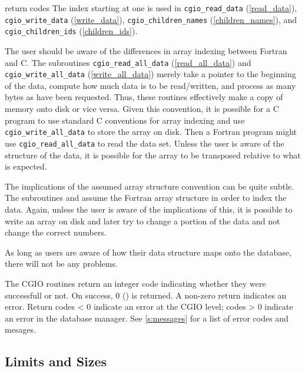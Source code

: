 \begin{Ventryi}{return codes}
      The index starting at one is used in
      \texttt{cgio\_read\_data} (\autoref{read_data}),
      \texttt{cgio\_write\_data} (\autoref{write_data}),
      \texttt{cgio\_children\_names} (\autoref{children_names}), and
      \texttt{cgio\_children\_ids} (\autoref{children_ids}).
 
      The user should be aware of the differences in array indexing
      between Fortran and C.
      The subroutines
      \texttt{cgio\_read\_all\_data} (\autoref{read_all_data}) and
      \texttt{cgio\_write\_all\_data} (\autoref{write_all_data})
      merely take a pointer to the beginning of the data, compute how
      much data is to be read/written, and process as many bytes as
      have been requested.
      Thus, these routines effectively make a copy of memory onto disk
      or vice versa.
      Given this convention, it is possible for a C program to
      use standard C conventions for array indexing and use
      \texttt{cgio\_write\_all\_data} to store the array on disk.
      Then a Fortran program might use \texttt{cgio\_read\_all\_data} to
      read the data set.
      Unless the user is aware of the structure of the data, it is
      possible for the array to be transposed relative to what is
      expected.
 
      The implications of the assumed array structure convention can be
      quite subtle.
      The subroutines  and
       assume the Fortran array structure in
      order to index the data.
      Again, unless the user is aware of the implications of this, it
      is possible to write an array on disk and later try to change a
      portion of the data and not change the correct numbers.
 
      As long as users are aware of how their data structure maps onto
      the database, there will not be any problems.
\item [return codes]
      The CGIO routines return an integer code indicating whether they
      were successfull or not. On success, 0 () is
      returned. A non-zero return indicates an error. Return codes < 0
      indicate an error at the CGIO level; codes > 0 indicate an
      error in the database manager. See \autoref{s:messages}
      for a list of error codes and mesages.
\end{Ventryi}

\subsection{Limits and Sizes}
\label{s:defaults}

